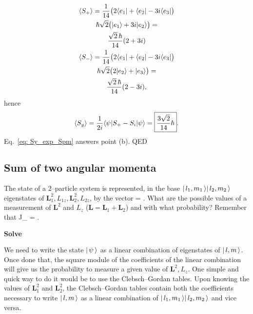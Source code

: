 \begin{enumerate}[(a)]
    \begin{gather}
        \langle S_+ \rangle = \frac{1}{14} \bigl( 2 \langle e_1 | + \langle e_2 | - 3i \langle e_3 | \bigr) \notag \\
        \hbar \sqrt{2} \bigl( | e_1 \rangle + 3i | e_2 \rangle \bigr) = \notag \\
        \frac{ \sqrt{2} \, \hbar }{14} (2 + 3i) \\
        \langle S_- \rangle = \frac{1}{14} \bigl( 2 \langle e_1 | + \langle e_2 | - 3i \langle e_3 | \bigr) \notag \\
        \hbar \sqrt{2} \bigl( 2| e_2 \rangle + | e_3 \rangle \bigr) = \notag \\
        \frac{ \sqrt{2} \, \hbar }{14} (2 - 3i) ,
    \end{gather}
    hence 
    \begin{equation}
        \label{eq: Sy_exp_Spm}
        \langle S_y \rangle = \frac{1}{2i} \langle \psi | S_+ - S_i | \psi \rangle = \boxed{\frac{3 \sqrt{2}}{14} \hbar}.
    \end{equation}
    Eq.~\eqref{eq: Sy_exp_Spm} answers point (b). QED
\end{enumerate}
\subsection{Sum of two angular momenta}
The state of a $2$--particle system is represented, in the base $ | \, l_1, m_1 \, \rangle| \, l_2, m_2 \, \rangle$ eigenstates of $\bm{L}_1^2, L_{1z}, \bm{L}_2^2, L_{2z}$, by the vector 
\be
    \label{eq: psi}
    \ke{\psi} =  . 
\ee
What are the possible values of a measurement of $\bm{L}^2 $ and $L_z$ ($\bm{L} = \bm{L}_1 + \bm{L}_2$) and with what probability?
Remember that 
\be
    \label{eq: ladder_operators_Jtot}
    J_\pm {} = \hbar {} .
\ee

\textbf{Solve}

We need to write the state $| \, \psi \, \rangle$ as a linear combination of eigenstates of $| \, l, m \, \rangle$. Once done that, the square module of the coefficients of the linear combination will give us the probability to measure a given value of $\bm{L}^2, L_z$.
One simple and quick way to do it would be to use the Clebsch--Gordan tables. Upon knowing the values of $\bm{L}_1^2$ and $\bm{L}_2^2$, the Clebsch--Gordan tables contain both the coefficients necessary to write $| \, l, m \, \rangle$ as a linear combination of $ | \, l_1, m_1 \, \rangle| \, l_2, m_2 \, \rangle$ and vice versa. 

